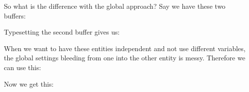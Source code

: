 {So what is the difference with the global approach? Say we have these two buffers:

\startbuffer
\startbuffer[one]
    \global\MyDimension\zeropoint
\stopbuffer

\startbuffer[two]
    \global\MyDimension\zeropoint
\stopbuffer
\stopbuffer

\typebuffer[option=TEX] \getbuffer

Typesetting the second buffer gives us:

\startlinecorrection
\getbuffer[two]
\stoplinecorrection

When we want to have these entities independent and not use different variables,
the global settings bleeding from one into the other entity is messy. Therefore
we can use this:

\startbuffer
\startbuffer[one]
    \constrained\MyDimension\zeropoint
\stopbuffer

\startbuffer[two]
    \constrained\MyDimension\zeropoint
\stopbuffer
\stopbuffer

\typebuffer[option=TEX] \getbuffer

Now we get this:

\startlinecorrection
\getbuffer[two]
\stoplinecorrection

}
